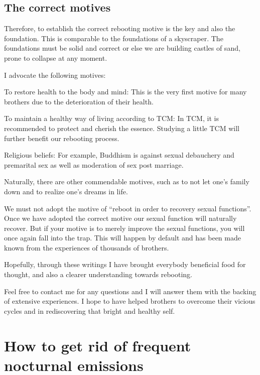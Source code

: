 \documentclass[
]{book}
\begin{document}
\hypertarget{the-correct-motives}{%
\section{The correct motives}\label{the-correct-motives}}

Therefore, to establish the correct rebooting motive is the key and also the foundation. This is comparable to the foundations of a skyscraper. The foundations must be solid and correct or else we are building castles of sand, prone to collapse at any moment.

I advocate the following motives:

To restore health to the body and mind: This is the very first motive for many brothers due to the deterioration of their health.

To maintain a healthy way of living according to TCM: In TCM, it is recommended to protect and cherish the essence. Studying a little TCM will further benefit our rebooting process.

Religious beliefs: For example, Buddhism is against sexual debauchery and premarital sex as well as moderation of sex post marriage.

Naturally, there are other commendable motives, such as to not let one's family down and to realize one's dreams in life.

We must not adopt the motive of ``reboot in order to recovery sexual functions''. Once we have adopted the correct motive our sexual function will naturally recover. But if your motive is to merely improve the sexual functions, you will once again fall into the trap. This will happen by default and has been made known from the experiences of thousands of brothers.

Hopefully, through these writings I have brought everybody beneficial food for thought, and also a clearer understanding towards rebooting.

Feel free to contact me for any questions and I will answer them with the backing of extensive experiences. I hope to have helped brothers to overcome their vicious cycles and in rediscovering that bright and healthy self.

\hypertarget{how-to-get-rid-of-frequent-nocturnal-emissions}{%
\chapter{How to get rid of frequent nocturnal emissions}\label{how-to-get-rid-of-frequent-nocturnal-emissions}}
\end{document}
